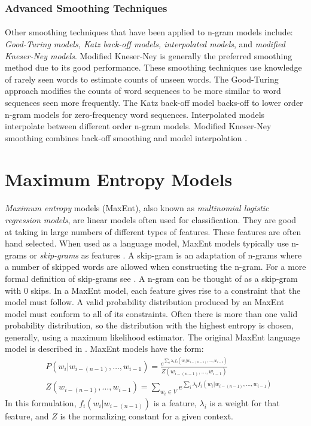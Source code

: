 \subsubsection{Advanced Smoothing Techniques}
\paragraph{}
 Other smoothing techniques that have been applied to n-gram models include: \emph{Good-Turing models, Katz back-off models, interpolated models}, and \emph{modified Kneser-Ney models}. Modified Kneser-Ney is generally the preferred smoothing method due to its good performance. These smoothing techniques use knowledge of rarely seen words to estimate counts of unseen words. The Good-Turing approach modifies the counts of word sequences to be more similar to word sequences seen more frequently. The Katz back-off model backs-off to lower order n-gram models for zero-frequency word sequences. Interpolated models interpolate between different order n-gram models. Modified Kneser-Ney smoothing combines back-off smoothing and model interpolation \cite{Jurafsky2009}.

\section{Maximum Entropy  Models}
\paragraph{}
\emph{Maximum entropy} models (MaxEnt), also known as \emph{multinomial logistic regression models}, are linear models often used for classification. They are good at taking in large numbers of different types of features. These features are often hand selected. When used as a language model, MaxEnt models typically use n-grams or \emph{skip-grams} as features \cite{Mikolov2012}. A skip-gram is an adaptation of n-grams where a number of skipped words are allowed when constructing the n-gram. For a more formal definition of skip-grams see \cite{Guthrie2006}. A n-gram can be thought of as a skip-gram with 0 skips. In a MaxEnt model, each feature gives rise to a constraint that the model must follow. A valid probability distribution produced by an MaxEnt model must conform to all of its constraints. Often there is more than one valid probability distribution, so the distribution with the highest entropy is chosen, generally, using a maximum likelihood estimator. The original MaxEnt language model is described in \cite{Rosenfeld1994}.
MaxEnt models have the form:
\begin{align}
&P(w_i | w_{i-(n-1)},\dots, w_{i-1}) = \frac{e^{\sum_i \lambda_i f_i(w_i | w_{i-(n-1)},\dots, w_{i-1})}}{Z(w_{i-(n-1)},
\dots, w_{i-1})} \label{eq:maxent}
\\
&Z(w_{i-(n-1)},\dots, w_{i-1}) = \sum_{w_i \in V} e^{\sum_i \lambda_i f_i(w_i | w_{i-(n-1)},\dots, w_{i-1})} \nonumber
\end{align}
In this formulation, $f_i(w_i | w_{i-(n-1)})$ is a feature, $\lambda_i$ is a weight for that feature, and $Z$ is the normalizing constant for a given context.
